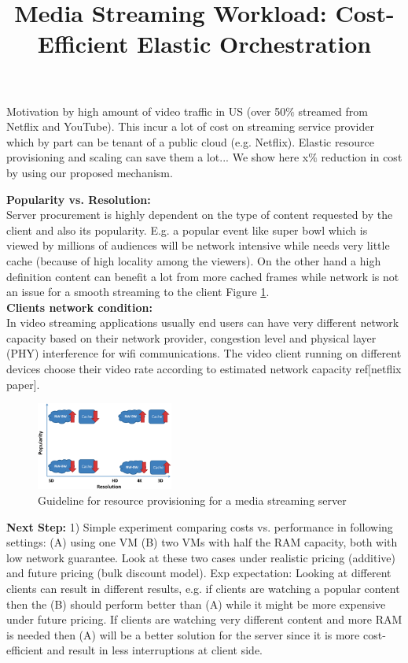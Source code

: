 \documentclass[12 pt]{article}
\begin{document}
\title{Media Streaming Workload: Cost-Efficient Elastic Orchestration}
\date{}
\maketitle

Motivation by high amount of video traffic in US (over 50$\%$ streamed from Netflix and YouTube). This incur a lot of cost on streaming service provider which by part can be tenant of a public cloud (e.g. Netflix). Elastic resource provisioning and scaling can save them a lot... We show here x$\%$ reduction in cost by using our proposed mechanism. %

{\bf Popularity vs. Resolution:}\\
Server procurement is highly dependent on the type of content requested by the client and also its popularity. E.g. a popular event like super bowl which is viewed by millions of audiences will be network intensive while needs very little cache (because of high locality among the viewers). On the other hand a high definition content can benefit a lot from more cached frames while network is not an issue for a smooth streaming to the client Figure \ref{fig:spectrum}.
\\

{\bf Clients network condition:} \\
In video streaming applications usually end users can have very different network capacity based on their network provider, congestion level and physical layer (PHY) interference for wifi communications. The video client running on different devices choose their video rate according to estimated network capacity ref[netflix paper].

\begin{figure}[!htb]
\centering
\includegraphics[trim={1cm 0.6cm 5cm 1cm},width=0.4\textwidth]{./spectrum.eps}
\caption{Guideline for resource provisioning for a media streaming server}\label{fig:spectrum}
\end{figure}

{\bf Next Step:} 1) Simple experiment comparing costs vs. performance in following settings: (A) using one VM (B) two VMs with half the RAM capacity, both with low network guarantee. Look at these two cases under realistic pricing (additive) and future pricing (bulk discount model).
Exp expectation: Looking at different clients can result in different results, e.g. if clients are watching a popular content then the (B) should perform better than (A) while it might be more expensive under future pricing. If clients are watching very different content and more RAM is needed then (A) will be a better solution for the server since it is more cost-efficient and result in less interruptions at client side.
\end{document}
